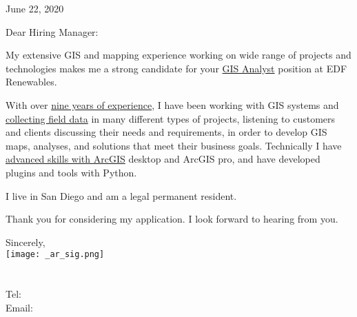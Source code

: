 \documentclass[letterpaper]{article}
\newcommand{\impt}[1]{\uline{#1}}
\newcommand{\CVjobTitle}{GIS Analyst}
\newcommand{\CVcompany}{EDF Renewables}
\begin{document}
\large

\null\hfill June 22, 2020
\vspace{1em}

Dear Hiring Manager:

\iffalse
\fi

My extensive GIS and mapping experience working on wide range of projects and
technologies makes me a strong candidate for your \impt{\CVjobTitle} position
at \CVcompany.

With over \impt{nine years of experience}, I have been working with GIS systems
and \impt{collecting field data} in many different types of
projects, listening to customers and clients discussing their needs and
requirements, in order to develop GIS maps, analyses, and solutions that meet
their business goals.  
Technically I have \impt{advanced skills with ArcGIS}
desktop and ArcGIS pro, and have developed plugins and tools with Python.

I live in San Diego and am a legal permanent resident.  

Thank you for considering my application.
I look forward to hearing from you.  


Sincerely,\\
    \hspace{1em} 
    \texttt{[image: \_ar\_sig.png]} \\
    \CVname \\
    \small
    \CVaddresswrap \\
    Tel: \CVphone \\
    Email: \CVemail
\end{document}
